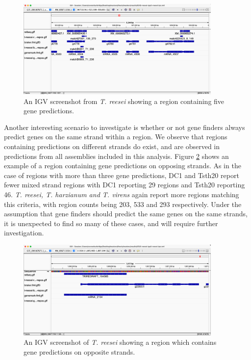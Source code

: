 \begin{figure}
  \centering
  \includegraphics[width=0.9\textwidth]{figures/igv/igv-uncertain-regions.png}
  \caption[Example of a region with many gene calls]{An IGV screenshot
    from \textit{T. reesei} showing a region containing five
    gene predictions.}
  \label{fig:uncertain-regions}
\end{figure}

Another interesting scenario to investigate is whether or not gene
finders always predict genes on the same strand within a region. We
observe that regions containing predictions on different strands do
exist, and are observed in predictions from all assemblies included in
this analysis. Figure \ref{fig:opposing-strands} shows an example of a
region containing gene predictions on opposing strands. As in the case
of regions with more than three gene predictions, DC1 and Tsth20
report fewer mixed strand regions with DC1 reporting 29 regions and
Tsth20 reporting 46. \textit{T. reesei, T. harzianum and T. virens}
again report more regions matching this criteria, with region counts
being 203, 533 and 293 respectively. Under the assumption that gene
finders should predict the same genes on the same strands, it is
unexpected to find so many of these cases, and will require further
investigation.

\begin{figure}
  \centering
  \includegraphics[width=0.9\textwidth]{figures/igv/igv-opposing-strands.png}
  \caption[Predictions on opposing strands]{An IGV screenshot of
    \textit{T. reesei} showing a region which contains gene
    predictions on opposite strands.}
  \label{fig:opposing-strands}
\end{figure}

